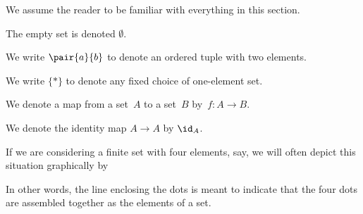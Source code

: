\label{sec:notn_and_background}

We assume the reader to be familiar with everything in this section.

The empty set is denoted $\emptyset$.

We write $\pair{a}{b}$ to denote an ordered tuple with two elements.

We write $\{*\}$ to denote any fixed choice of one-element set.

We denote a map from a set~$A$ to a set~$B$ by~$f\colon A\to B$.

We denote the identity map $A\to A$ by $\id_A$.

If we are considering a finite set with four elements, say, we will often depict this situation graphically by

In other words, the line enclosing the dots is meant to indicate that the four dots are assembled together as the elements of a set.

